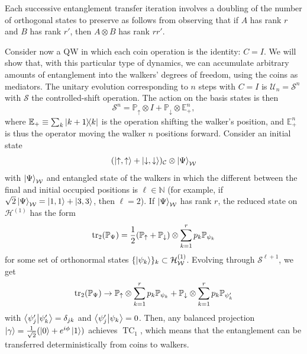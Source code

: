 \documentclass[
	aps, pra,
	superscriptaddress, twocolumn,
	floatfix,
	10pt
]{revtex4-1}
\newcommand{\on}[1]{\operatorname{#1}}
\newcommand{\parTitle}[1]{\noindent{\color{Mahogany}(\emph{#1})}}
\newcommand{\EE}{\mathbb{E}}
\newcommand{\NN}{\mathbb{N}}
\newcommand{\PP}{\mathbb{P}}
\newcommand{\calC}{{\mathcal{C}}}
\newcommand{\calH}{{\mathcal{H}}}
\newcommand{\calS}{{\mathcal{S}}}
\newcommand{\calU}{{\mathcal{U}}}
\newcommand{\calW}{{\mathcal{W}}}
\newcommand{\HW}{\calH_\calW}
\renewcommand{\parTitle}[1]{}
\begin{document}
Each successive entanglement transfer iteration involves a doubling of the number of orthogonal states to preserve as follows from observing that if $A$ has rank $r$ and $B$ has rank $r'$, then $A\otimes B$ has rank $rr'$.

\parTitle{QWs with $C=I$}
Consider now a QW in which each coin operation is the identity: $C=I$.
We will show that, with this particular type of dynamics, we can accumulate arbitrary amounts of entanglement into the walkers' degrees of freedom, using the coins as mediators.
The unitary evolution corresponding to $n$ steps with $C=I$ is $\calU_{n}=\calS^n$ with $\calS$ the controlled-shift operation.
The action on the basis states is then
\begin{equation}
    \calS^n = \PP_\uparrow \otimes I + \PP_\downarrow\otimes \EE_+^n,
\end{equation}
where $\EE_+\equiv \sum_k\ketbra{k+1}{k}$ is the operation shifting the walker's position, and $\EE_+^n$ is thus the operator moving the walker $n$ positions forward.
Consider an initial state
\begin{equation}
    (\ket{\uparrow,\uparrow}+\ket{\downarrow,\downarrow})_\calC\otimes
    \ket{\Psi}_\calW
\end{equation}
with $\ket{\Psi}_\calW$ and entangled state of the walkers in which the different between the final and initial occupied positions is $\ell\in\NN$
(for example, if $\sqrt2\ket{\Psi}_\calW=\ket{1,1}+\ket{3,3}$, then $\ell=2$).
If $\ket{\Psi}_\calW$ has rank $r$, the reduced state on $\calH^{(1)}$ has the form
\begin{equation}
    \tr_2(\PP_{\Psi}) = \frac12 (\PP_\uparrow+\PP_\downarrow)\otimes\sum_{k=1}^r p_k \PP_{\psi_k}
\end{equation}
for some set of orthonormal states $\{\ket{\psi_k}\}_k\subset\HW^{(1)}$.
Evolving through $\calS^{\ell+1}$, we get
\begin{equation}
    \tr_2(\PP_{\Psi}) \to
    \PP_\uparrow\otimes\sum_{k=1}^r p_k \PP_{\psi_k} +
    \PP_\downarrow\otimes\sum_{k=1}^r p_k \PP_{\psi_k'}
\end{equation}
with $\braket{\psi_j'}{\psi_k'}=\delta_{jk}$ and $\braket{\psi_j'}{\psi_k}=0$.
Then, any balanced projection $\ket\gamma=\frac{1}{\sqrt2}(\ket0+e^{i\phi}\ket1)$ achieves $\on{TC}_1$, which means that the entanglement can be transferred deterministically from coins to walkers. 
\end{document}
